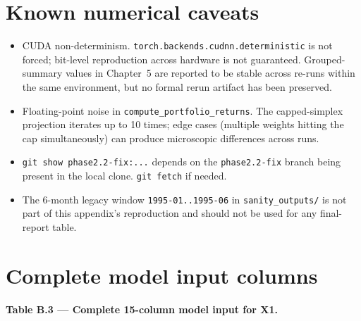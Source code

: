 \section{Known numerical caveats}

\label{sec:known-numerical-caveats}

\begin{itemize}
\item CUDA non-determinism. \texttt{torch.backends.cudnn.deterministic} is not forced; bit-level reproduction across hardware is not guaranteed. Grouped-summary values in Chapter~5 are reported to be stable across re-runs within the same environment, but no formal rerun artifact has been preserved.
\item Floating-point noise in \texttt{compute\_portfolio\_returns}. The capped-simplex projection iterates up to 10 times; edge cases (multiple weights hitting the cap simultaneously) can produce microscopic differences across runs.
\item \texttt{git show phase2.2-fix:...} depends on the \texttt{phase2.2-fix} branch being present in the local clone. \texttt{git fetch} if needed.
\item The 6-month legacy window \texttt{1995-01..1995-06} in \texttt{sanity\_outputs/} is not part of this appendix's reproduction and should not be used for any final-report table.
\end{itemize}

\section{Complete model input columns}

\label{sec:complete-model-input-columns}

\textbf{Table B.3 --- Complete 15-column model input for X1.}

